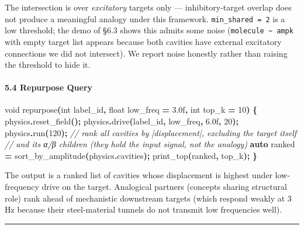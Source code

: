 \documentclass[
  11pt,
  a4paper,
]{article}
\newenvironment{Shaded}{\begin{snugshade}}{\end{snugshade}}
\newcommand{\BuiltInTok}[1]{#1}
\newcommand{\CommentTok}[1]{\textcolor[rgb]{0.56,0.35,0.01}{\textit{#1}}}
\newcommand{\DataTypeTok}[1]{\textcolor[rgb]{0.13,0.29,0.53}{#1}}
\newcommand{\DecValTok}[1]{\textcolor[rgb]{0.00,0.00,0.81}{#1}}
\newcommand{\FloatTok}[1]{\textcolor[rgb]{0.00,0.00,0.81}{#1}}
\newcommand{\KeywordTok}[1]{\textcolor[rgb]{0.13,0.29,0.53}{\textbf{#1}}}
\newcommand{\NormalTok}[1]{#1}
\newcommand{\OperatorTok}[1]{\textcolor[rgb]{0.81,0.36,0.00}{\textbf{#1}}}
\begin{document}
The intersection is over \emph{excitatory} targets only ---
inhibitory-target overlap does not produce a meaningful analogy under
this framework. \texttt{min\_shared\ =\ 2} is a low threshold; the demo
of §6.3 shows this admits some noise
(\texttt{molecule\ \textasciitilde{}\ ampk} with empty target list
appears because both cavities have external excitatory connections we
did not intersect). We report noise honestly rather than raising the
threshold to hide it.

\paragraph{5.4 Repurpose Query}\label{repurpose-query}

\begin{Shaded}
\begin{Highlighting}[]
\DataTypeTok{void}\NormalTok{ repurpose}\OperatorTok{(}\DataTypeTok{int}\NormalTok{ label\_id}\OperatorTok{,} \DataTypeTok{float}\NormalTok{ low\_freq }\OperatorTok{=} \FloatTok{3.0}\BuiltInTok{f}\OperatorTok{,} \DataTypeTok{int}\NormalTok{ top\_k }\OperatorTok{=} \DecValTok{10}\OperatorTok{)} \OperatorTok{\{}
\NormalTok{    physics}\OperatorTok{.}\NormalTok{reset\_field}\OperatorTok{();}
\NormalTok{    physics}\OperatorTok{.}\NormalTok{drive}\OperatorTok{(}\NormalTok{label\_id}\OperatorTok{,}\NormalTok{ low\_freq}\OperatorTok{,} \FloatTok{6.0}\BuiltInTok{f}\OperatorTok{,} \DecValTok{20}\OperatorTok{);}
\NormalTok{    physics}\OperatorTok{.}\NormalTok{run}\OperatorTok{(}\DecValTok{120}\OperatorTok{);}
    \CommentTok{// rank all cavities by |displacement|, excluding the target itself}
    \CommentTok{// and its α/β children (they hold the input signal, not the analogy)}
    \KeywordTok{auto}\NormalTok{ ranked }\OperatorTok{=}\NormalTok{ sort\_by\_amplitude}\OperatorTok{(}\NormalTok{physics}\OperatorTok{.}\NormalTok{cavities}\OperatorTok{);}
\NormalTok{    print\_top}\OperatorTok{(}\NormalTok{ranked}\OperatorTok{,}\NormalTok{ top\_k}\OperatorTok{);}
\OperatorTok{\}}
\end{Highlighting}
\end{Shaded}

The output is a ranked list of cavities whose displacement is highest
under low-frequency drive on the target. Analogical partners (concepts
sharing structural role) rank ahead of mechanistic downstream targets
(which respond weakly at 3 Hz because their steel-material tunnels do
not transmit low frequencies well).

\begin{center}\rule{0.5\linewidth}{0.5pt}\end{center}
\end{document}
